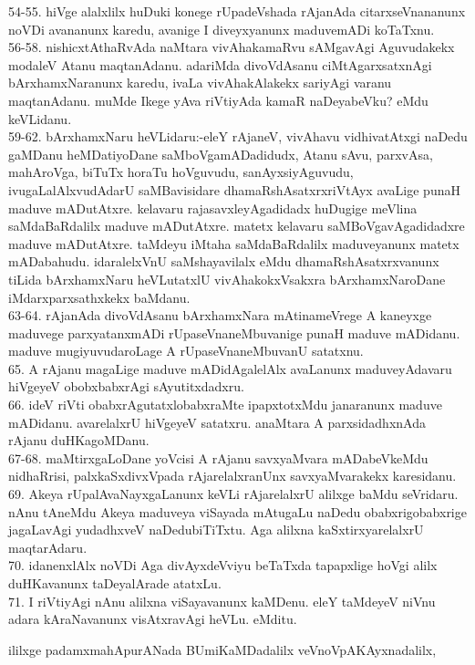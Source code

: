 \documentclass{article}
\begin{document}
54-55. hiVge alalxlilx huDuki konege rUpadeVshada rAjanAda citarxseVnananunx noVDi avananunx karedu, avanige I diveyxyanunx maduvemADi koTaTxnu.\\
56-58. nishicxtAthaRvAda naMtara vivAhakamaRvu sAMgavAgi Aguvudakekx modaleV Atanu maqtanAdanu. adariMda divoVdAsanu ciMtAgarxsatxnAgi bArxhamxNaranunx karedu, ivaLa vivAhakAlakekx sariyAgi varanu maqtanAdanu. muMde Ikege yAva riVtiyAda kamaR naDeyabeVku? eMdu keVLidanu.\\
59-62. bArxhamxNaru heVLidaru:-eleY rAjaneV, vivAhavu vidhivatAtxgi naDedu gaMDanu heMDatiyoDane saMboVgamADadidudx, Atanu sAvu, parxvAsa, mahAroVga, biTuTx horaTu hoVguvudu, sanAyxsiyAguvudu, ivugaLalAlxvudAdarU saMBavisidare dhamaRshAsatxrxriVtAyx avaLige punaH maduve mADutAtxre. kelavaru rajasavxleyAgadidadx huDugige meVlina saMdaBaRdalilx maduve mADutAtxre. matetx kelavaru saMBoVgavAgadidadxre maduve mADutAtxre. taMdeyu iMtaha saMdaBaRdalilx maduveyanunx matetx mADabahudu. idaralelxVnU saMshayavilalx eMdu dhamaRshAsatxrxvanunx tiLida bArxhamxNaru heVLutatxlU vivAhakokxVsakxra bArxhamxNaroDane iMdarxparxsathxkekx baMdanu.\\
63-64. rAjanAda divoVdAsanu bArxhamxNara mAtinameVrege A kaneyxge maduvege parxyatanxmADi rUpaseVnaneMbuvanige punaH maduve mADidanu. maduve mugiyuvudaroLage A rUpaseVnaneMbuvanU satatxnu.\\
65. A rAjanu magaLige maduve mADidAgalelAlx avaLanunx maduveyAdavaru hiVgeyeV obobxbabxrAgi sAyutitxdadxru.\\
66. ideV riVti obabxrAgutatxlobabxraMte ipapxtotxMdu janaranunx maduve mADidanu. avarelalxrU hiVgeyeV satatxru. anaMtara A parxsidadhxnAda rAjanu duHKagoMDanu.\\
67-68. maMtirxgaLoDane yoVcisi A rAjanu savxyaMvara mADabeVkeMdu nidhaRrisi, palxkaSxdivxVpada rAjarelalxranUnx savxyaMvarakekx karesidanu.\\
69. Akeya rUpalAvaNayxgaLanunx keVLi rAjarelalxrU alilxge baMdu seVridaru. nAnu tAneMdu Akeya maduveya viSayada mAtugaLu naDedu obabxrigobabxrige jagaLavAgi yudadhxveV naDedubiTiTxtu. Aga alilxna kaSxtirxyarelalxrU maqtarAdaru.\\
70. idanenxlAlx noVDi Aga divAyxdeVviyu beTaTxda tapapxlige hoVgi alilx duHKavanunx taDeyalArade atatxLu.\\
71. I riVtiyAgi nAnu alilxna viSayavanunx kaMDenu. eleY taMdeyeV niVnu adara kAraNavanunx visAtxravAgi heVLu. eMditu.

\begin{center}
ililxge padamxmahApurANada BUmiKaMDadalilx veVnoVpAKAyxnadalilx,
\end{center}
\end{document}
